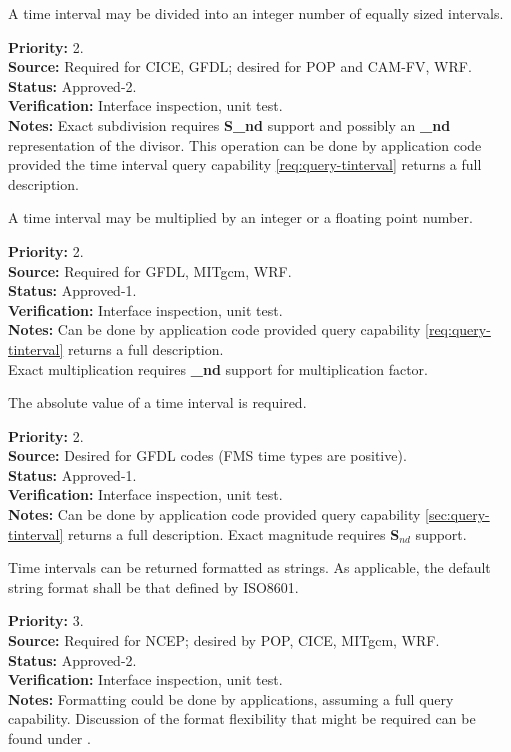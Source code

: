 A time interval may be divided into an integer number of equally sized intervals. 
\begin{reqlist}
{\bf Priority:} 2. \\
{\bf Source:} Required for CICE, GFDL; desired for POP and CAM-FV, WRF. \\
{\bf Status:} Approved-2. \\
{\bf Verification:} Interface inspection, unit test. \\
{\bf Notes:} Exact subdivision requires {\bf S\_nd} support and possibly an {\bf \_nd} 
representation of the divisor.  This operation can be done by application code 
provided the time interval query capability \ref{req:query-tinterval} returns a 
full description. 
\end{reqlist}

A time interval may be multiplied by an integer or a floating point number. 
\begin{reqlist}
{\bf Priority:} 2. \\
{\bf Source:} Required for GFDL, MITgcm, WRF. \\
{\bf Status:} Approved-1. \\
{\bf Verification:} Interface inspection, unit test. \\
{\bf Notes:}  Can be done by application code provided query capability 
\ref{req:query-tinterval} returns a full description. \\
Exact multiplication requires {\bf \_nd} support for multiplication factor.
\end{reqlist}

The absolute value of a time interval is required.
\begin{reqlist}
{\bf Priority:} 2. \\
{\bf Source:} Desired for GFDL codes (FMS time types are positive). \\
{\bf Status:} Approved-1. \\
{\bf Verification:} Interface inspection, unit test. \\
{\bf Notes:}  Can be done by application code provided query capability 
\ref{sec:query-tinterval} returns a full description. 
Exact magnitude requires 
{\bf S$_{nd}$} support.
\end{reqlist}

Time intervals can be returned formatted as strings.  As applicable, the
default string format shall be that defined by ISO8601.
\begin{reqlist}
{\bf Priority:} 3. \\ 
{\bf Source:} Required for NCEP; desired by POP, CICE, MITgcm, WRF. \\
{\bf Status:} Approved-2. \\
{\bf Verification:} Interface inspection, unit test. \\
{\bf Notes:}  Formatting could be done by applications, assuming a full query 
capability.  Discussion of the format flexibility that might be required can be 
found under \cite{javaCalendar}.
\end{reqlist}

